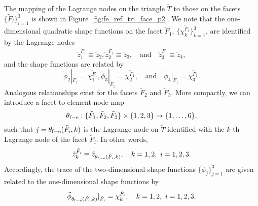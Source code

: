 The mapping of the Lagrange nodes on the triangle $\tilde T$ to those on the facets $\{ \tilde F_i \}_{i=1}^3$ is shown in Figure~\ref{fig:fe_ref_tri_face_p2}. We note that the one-dimensional quadratic shape functions on the facet $\tilde F_1$, $\{ \chi_k^{\tilde F_1} \}_{k=1}^3$, are identified by the Lagrange nodes
\begin{equation*}
  \tilde z_1^{\tilde F_1} \equiv \tilde z_2 ,
  \tilde z_2^{\tilde F_1} \equiv \tilde z_3 ,
  \quad \text{and} \quad
  \tilde z_3^{\tilde F_1} \equiv \tilde z_4 ,
\end{equation*}
and the shape functions are related by
\begin{equation*}
  \tilde \phi_2 |_{\tilde F_1} = \chi_1^{\tilde F_1} ,
  \tilde \phi_3 |_{\tilde F_1} = \chi_2^{\tilde F_1} ,
  \quad \text{and} \quad
  \tilde \phi_4 |_{\tilde F_1} = \chi_3^{\tilde F_1} .
\end{equation*}
Analogous relationships exist for the facets $\tilde F_2$ and $\tilde F_3$. 
More compactly, we can introduce a facet-to-element node map
\begin{equation*}
  \theta_{\rm f-e} : \{\tilde F_1, \tilde F_2, \tilde F_3 \} \times \{1,2,3\} \to \{1,\dots,6\},
\end{equation*}
such that $j = \theta_{\rm f-e}(\tilde F_i,k)$ is the Lagrange node on $\tilde T$ identified with the $k$-th Lagrange node of the facet $\tilde F_i$. In other words,
\begin{equation*}
  \tilde z_k^{\tilde F_i} \equiv \tilde z_{\theta_{\rm f-e}(\tilde F_i,k)}, \quad k = 1,2, \ i = 1,2,3.
\end{equation*}
Accordingly, the trace of the two-dimensional shape functions $\{\tilde \phi_j\}_{j=1}^3$ are given related to the one-dimensional shape functions by
\begin{equation*}
  \tilde \phi_{\theta_{\rm f-e}(\tilde F_i,k)}|_{\tilde F_i} = \chi^{\tilde F_i}_k, \quad k = 1,2, \ i = 1,2,3.
\end{equation*}


